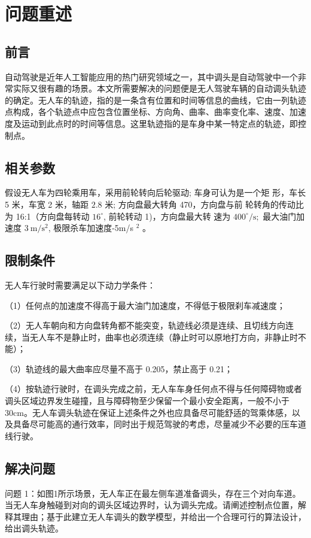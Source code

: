 \documentclass{article}
\begin{document}
\section{问题重述}                                          %
\subsection{前言}
自动驾驶是近年人工智能应用的热门研究领域之一，其中调头是自动驾驶中一个非常实际又很有趣的场景。本文所需要解决的问题便是无人驾驶车辆的自动调头轨迹的确定。无人车的轨迹，指的是一条含有位置和时间等信息的曲线，它由一列轨迹点构成，各个轨迹点中应包含位置坐标、方向角、曲率、曲率变化率、速度、加速度及运动到此点时的时间等信息。这里轨迹指的是车身中某一特定点的轨迹，即控制点。

\subsection{相关参数}
假设无人车为四轮乘用车，采用前轮转向后轮驱动; 车身可认为是一个矩
形，车长 5 米，车宽 2 米，轴距 $2.8$ 米; 方向盘最大转角 470，方向盘与前
轮转角的传动比为 16:1（方向盘每转动 $16^{\circ}$, 前轮转动 1)，方向盘最大转
速为 $400^{\circ} / \mathrm{s} ;$ 最大油门加速度 $3 \mathrm{~m} / \mathrm{s}^{2}$, 极限杀车加速度-5m/s $^{2}$ 。

\subsection{限制条件}
\noindent 无人车行驶时需要满足以下动力学条件：

\noindent（1）任何点的加速度不得高于最大油门加速度，不得低于极限刹车减速度；

\noindent（2）无人车朝向和方向盘转角都不能突变，轨迹线必须是连续、且切线方向连续，当无人车不是静止时，曲率也必须连续（静止时可以原地打方向，非静止时不能）；

\noindent（3）轨迹线的最大曲率应尽量不高于 0.205，禁止高于 0.21；

\noindent（4）按轨迹行驶时，在调头完成之前，无人车车身任何点不得与任何障碍物或者调头区域边界发生碰撞，且与障碍物至少保留一个最小安全距离，一般不小于 30cm。无人车调头轨迹在保证上述条件之外也应具备尽可能舒适的驾乘体感，以及具备尽可能高的通行效率，同时出于规范驾驶的考虑，尽量减少不必要的压车道线行驶。

\subsection{解决问题}
\noindent 问题 1：如图1所示场景，无人车正在最左侧车道准备调头，存在三个对向车道。当无人车身触碰到对向的调头区域边界时，认为调头完成。请阐述控制点位置，解释其理由；基于此建立无人车调头的数学模型，并给出一个合理可行的算法设计，给出调头轨迹。
\end{document}
